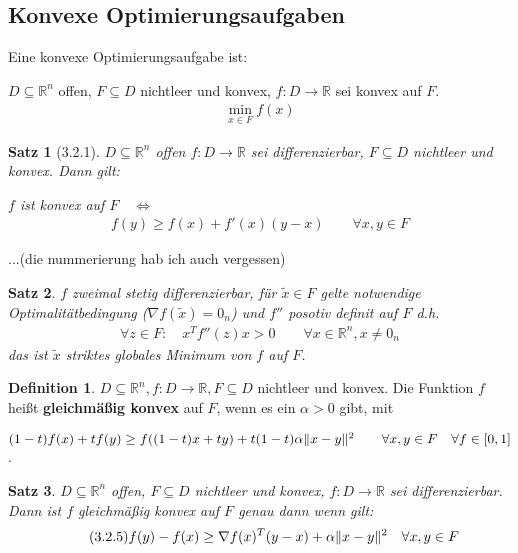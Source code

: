 \documentclass[ngerman,halfparskip]{scrartcl}
\DeclarePairedDelimiter{\norm}{\lVert}{\rVert}
\newtheorem*{satz}{Satz}
\theoremstyle{definition}
\newtheorem*{defin}{Definition}
\newcommand*{\R}{\mathbb{R}}      %
\begin{document}
\subsection{Konvexe Optimierungsaufgaben}
Eine konvexe Optimierungsaufgabe ist:

$ D\subseteq \R^n $ offen, $ F\subseteq D $ nichtleer und konvex, $ f\colon D\rightarrow \R $ sei konvex auf $ F $. 
\begin{gather}\tag{P} \min\limits_{x\in F}f(x) \end{gather}

\begin{satz}[3.2.1] $ D\subseteq \R^n $ offen $ f\colon D\rightarrow \R $ sei differenzierbar, $ F\subseteq D $ nichtleer und konvex. Dann gilt: 

$ f $ ist konvex auf $ F \quad \Leftrightarrow$
\begin{gather}\tag{3.2.1} f(y)\geq f(x)+f'(x)(y-x) \qquad \forall x,y\in F\end{gather}
\end{satz}


...(die nummerierung hab ich auch vergessen)


\begin{satz}
$f$ zweimal stetig differenzierbar, für $\tilde x  \in F$ gelte notwendige Optimalitätbedingung ($\nabla f (\tilde x)=0_n$) und $f''$ posotiv definit auf $F$ d.h. 
\begin{gather}\tag{3.2.4}
\forall z\in F\colon  \quad x^Tf''(z)x>0 \qquad \forall x\in\R^n, x\neq 0_n
\end{gather}
das ist $\tilde x$ striktes globales Minimum von $f$ auf $F$.
\end{satz}

\begin{defin}
$D\subseteq\R^n, f\colon D\rightarrow\R, F\subseteq D$ nichtleer und konvex. Die Funktion $f$ heißt \textbf{gleichmäßig konvex} auf $F$, wenn es ein $\alpha > 0$ gibt, mit 

$(1-t)f(x)+tf(y)\geq f((1-t)x+ty)+t(1-t)\alpha \norm{x-y}^2 \qquad\forall x,y \in F \quad \forall f \in [0,1]$.
\end{defin}

\begin{satz}
$D\subseteq\R^n$ offen, $F\subseteq D$ nichtleer und konvex, $f\colon D\rightarrow\R$ sei differenzierbar. Dann ist $f$ gleichmäßig konvex auf $F$ genau dann wenn gilt:
\begin{gather}\tag{3.2.5}
f(y)-f(x)\geq \nabla f (x)^T(y-x)+\alpha\norm{x-y}^2 \quad \forall x,y\in F
\end{gather}
\end{satz}
\end{document}
